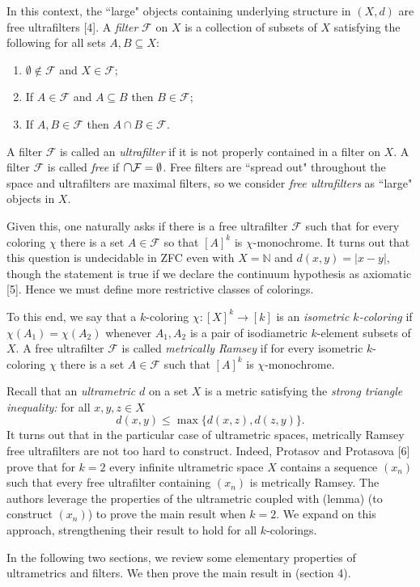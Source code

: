 In this context, the ``large" objects containing underlying structure in \( (X,d) \) are free ultrafilters [4]. A \emph{filter} \( \mathcal{F}  \) on \( X \) is a collection of subsets of \( X \) satisfying the following for all sets \( A, B \subseteq X \):
\begin{enumerate}[leftmargin=1.2cm]
	\item \( \emptyset  \notin \mathcal{F}  \) and \( X \in \mathcal{F}  \);
	\item If \( A \in \mathcal{F} \) and \( A \subseteq B \) then \( B \in \mathcal{F}  \);
	\item If \( A, B \in \mathcal{F}  \) then \( A \cap B \in \mathcal{F}  \).
\end{enumerate}
A filter \( \mathcal{F}  \) is called an \emph{ultrafilter} if it is not properly contained in a filter on \( X \). A filter \( \mathcal{F}  \) is called \emph{free} if \( \medcap \mathcal{F} = \emptyset  \). Free filters are ``spread out" throughout the space and ultrafilters are maximal filters, so we consider \emph{free ultrafilters} as ``large" objects in \( X \).

Given this, one naturally asks if there is a free ultrafilter \( \mathcal{F}  \) such that for every coloring \( \chi \) there is a set \( A \in \mathcal{F}  \) so that \( [A]^{k}  \) is \( \chi \)-monochrome. It turns out that this question is undecidable in ZFC even with \( X = \mathbb{N}  \) and \( d(x,y) = |x-y| \), though the statement is true if we declare the continuum hypothesis as axiomatic [5]. Hence we must define more restrictive classes of colorings.

To this end, we say that a \( k \)-coloring \( \chi : [X]^{k} \to [k]  \) is an \emph{isometric \( k \)-coloring} if \( \chi (A_1) = \chi (A_2) \) whenever \( A_1, A_2 \) is a pair of isodiametric \( k \)-element subsets of \( X \). A free ultrafilter \( \mathcal{F}  \) is called \emph{metrically Ramsey} if for every isometric \( k \)-coloring \( \chi \) there is a set \( A \in \mathcal{F}  \) such that \( [A]^{k}  \) is \( \chi \)-monochrome.

Recall that an \emph{ultrametric} \( d \) on a set \( X \) is a metric satisfying the \emph{strong triangle inequality:} for all \( x,y,z \in X \) \[ d(x,y) \leq \max \{ d(x,z), d(z,y) \}.  \]
It turns out that in the particular case of ultrametric spaces, metrically Ramsey free ultrafilters are not too hard to construct. Indeed, Protasov and Protasova [6] prove that for \( k = 2 \) every infinite ultrametric space \( X \) contains a sequence \( (x_{n}) \) such that every free ultrafilter containing \( (x_{n}) \) is metrically Ramsey. The authors leverage the properties of the ultrametric coupled with (lemma) (to construct \( (x_{n}) \)) to prove the main result when \( k = 2 \). We expand on this approach, strengthening their result to hold for all \( k \)-colorings.

In the following two sections, we review some elementary properties of ultrametrics and filters. We then prove the main result in (section 4).

